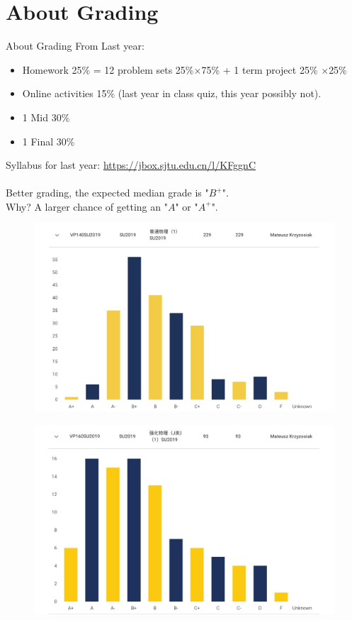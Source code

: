 \documentclass{beamer}
\begin{document}
\section{About Grading}
\begin{frame}{About Grading}
  From Last year:
  \begin{itemize}
    \item Homework 25\% =  12 problem sets 25\%$\times $75\% + 1 term project 25\% $\times $25\%
    \item Online activities 15\% (last year in class quiz, this year possibly not).
    \item 1 Mid 30\%
    \item 1 Final 30\%
  \end{itemize}
    Syllabus for last year: \underline{\small{\url{https://jbox.sjtu.edu.cn/l/KFggnC}}}\\
    ~\\
    Better grading, the expected median grade is "$B^+$".\\
    Why? A larger chance of getting an "$A$" or "$A^+$".
    \end{frame}

    \begin{frame}
      \begin{figure}[htbp]
        \centering
        \includegraphics[width=0.5 \linewidth, angle =0]{150.png}
    \end{figure}
    \begin{figure}[htbp]
      \centering
      \includegraphics[width=0.5 \linewidth, angle =0]{160.png}
  \end{figure}
    \end{frame}
\end{document}
